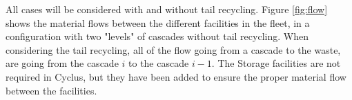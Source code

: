 \documentclass{anstrans}
\begin{document}
All cases will be considered with and without tail recycling. Figure
\ref{fig:flow} shows the material flows between the different facilities in the
fleet, in a configuration with two "levels" of cascades without tail recycling.
When considering the tail recycling, all of the flow going from a cascade to the
waste, are going from the cascade $i$ to the cascade $i-1$.  The Storage
facilities are not required in Cyclus, but they have been added to ensure the
proper material flow between the facilities.


\begin{figure}[ht] %
  \centering

\end{figure}
\end{document}
